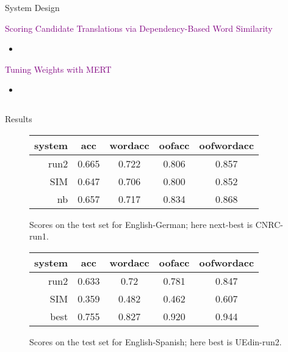 \documentclass[final,t]{beamer}
\begin{document}
\begin{frame}{}
\begin{columns}[t]
\begin{column}{.64\linewidth}
\begin{columns}
\begin{column}{.48\linewidth}
\begin{block}{System Design}
\begin{center}
  \textcolor{purple}{Scoring Candidate Translations via Dependency-Based Word Similarity}
  \begin{itemize}
  \item 
  \end{itemize}

  \textcolor{purple}{Tuning Weights with MERT}
  \begin{itemize}
  \item 
  \end{itemize}

\end{center}

\end{block}

    \end{column}
  \end{columns}
  \end{column}
  \end{columns}

\begin{columns}
  \begin{column}{.64\linewidth}

\begin{block}{Results}

\begin{figure}[t]
  \begin{center}
  \begin{tabular}{|r|c|c|c|c|}
    \hline
    system & acc      & wordacc  & oofacc & oofwordacc \\
    \hline
    run2  &  0.665 & 0.722  &  0.806  & 0.857 \\
    SIM    &  0.647 & 0.706 & 0.800 & 0.852 \\
    nb     &  0.657   & 0.717   & 0.834 & 0.868    \\
    \hline
  \end{tabular}
  \end{center}
\caption{Scores on the test set for English-German; here next-best is CNRC-run1.}
\label{fig:theresults-en-de}
\end{figure}

\begin{figure}[t]
  \begin{center}
  \begin{tabular}{|r|c|c|c|c|}
    \hline
    system & acc      & wordacc  & oofacc & oofwordacc \\
    \hline
    run2  &  0.633 & 0.72 & 0.781 & 0.847 \\
    SIM    &  0.359 &  0.482 & 0.462 & 0.607 \\
    best   &  0.755 & 0.827   & 0.920  & 0.944 \\
    \hline
  \end{tabular}
  \end{center}
\caption{Scores on the test set for English-Spanish; here best is UEdin-run2.}
\label{fig:theresults-en-es}
\end{figure}


\end{block}
\end{column}
\end{columns}
\end{frame}
\end{document}
